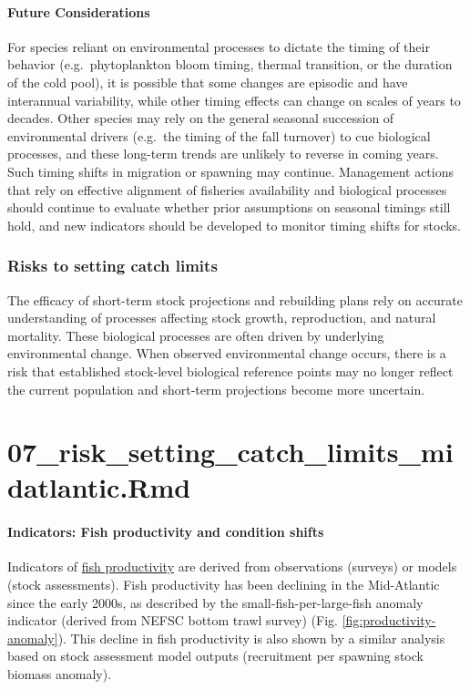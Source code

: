\documentclass[
  10pt,
]{article}
\begin{document}
\paragraph{Future Considerations}\label{future-considerations-1}

For species reliant on environmental processes to dictate the timing of their behavior (e.g.~phytoplankton bloom timing, thermal transition, or the duration of the cold pool), it is possible that some changes are episodic and have interannual variability, while other timing effects can change on scales of years to decades. Other species may rely on the general seasonal succession of environmental drivers (e.g.~the timing of the fall turnover) to cue biological processes, and these long-term trends are unlikely to reverse in coming years. Such timing shifts in migration or spawning may continue. Management actions that rely on effective alignment of fisheries availability and biological processes should continue to evaluate whether prior assumptions on seasonal timings still hold, and new indicators should be developed to monitor timing shifts for stocks.

\subsubsection{Risks to setting catch limits}\label{risks-to-setting-catch-limits}

The efficacy of short-term stock projections and rebuilding plans rely on accurate understanding of processes affecting stock growth, reproduction, and natural mortality. These biological processes are often driven by underlying environmental change. When observed environmental change occurs, there is a risk that established stock-level biological reference points may no longer reflect the current population and short-term projections become more uncertain.

\section{07\_risk\_setting\_catch\_limits\_midatlantic.Rmd}\label{risk_setting_catch_limits_midatlantic.rmd}

\paragraph{Indicators: Fish productivity and condition shifts}\label{indicators-fish-productivity-and-condition-shifts}

Indicators of \href{https://noaa-edab.github.io/catalog/productivity_anomaly.html}{fish productivity} are derived from observations (surveys) or models (stock assessments). Fish productivity has been declining in the Mid-Atlantic since the early 2000s, as described by the small-fish-per-large-fish anomaly indicator (derived from NEFSC bottom trawl survey) (Fig. \ref{fig:productivity-anomaly}). This decline in fish productivity is also shown by a similar analysis based on stock assessment model outputs (recruitment per spawning stock biomass anomaly).
\end{document}
